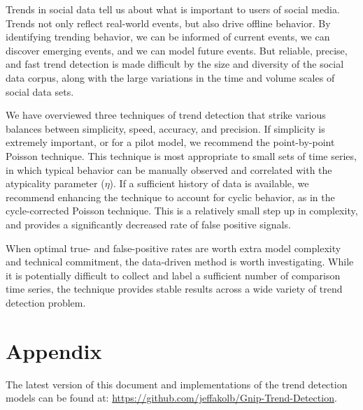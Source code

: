 \documentclass{article}
\begin{document}
Trends in social data tell us about what is important to users of social media.
Trends not only reflect real-world events, but also drive offline behavior. By
identifying trending behavior, we can be informed of current events, we can
discover emerging events, and we can model future events. But reliable,
precise, and fast trend detection is made difficult by the size and diversity
of the social data corpus, along with the large variations in the time and
volume scales of social data sets. 

We have overviewed three techniques of trend detection that strike various
balances between simplicity, speed, accuracy, and precision.
If simplicity is extremely important, or for a pilot model, we
recommend the point-by-point Poisson technique. This technique is most
appropriate to small sets of time series, in which typical behavior can be
manually observed and correlated with the atypicality parameter ($\eta$). If a 
sufficient history of data is available, we recommend enhancing the technique
to account for cyclic behavior, as in the cycle-corrected Poisson technique.
This is a relatively small step up in complexity, and provides a significantly
decreased rate of false positive signals. 

When optimal true- and false-positive rates are worth extra model complexity
and technical commitment, the data-driven method is worth investigating. While it
is potentially difficult to collect and label a sufficient number of comparison
time series, the technique provides stable results across a wide variety of
trend detection problem. 


\appendix
\section{Appendix}
The latest version of this document 
and implementations of the trend detection models 
can be found at:
\noindent \url{https://github.com/jeffakolb/Gnip-Trend-Detection}.

%

\end{document}
